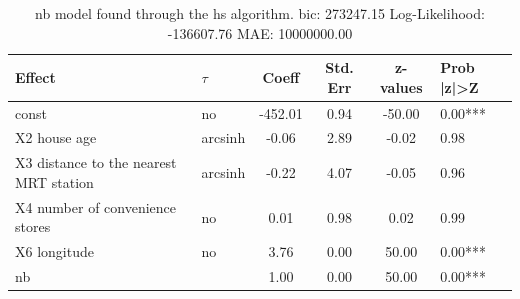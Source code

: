 \begin{table}
	\caption{nb model found through the hs algorithm. bic: 273247.15 Log-Likelihood: -136607.76 MAE: 10000000.00}
	\begin{center}
		\begin{tabular}{|l|l|c|c|c|l|}
			\hline
			Effect & $\tau$ & Coeff & Std. Err & z-values & Prob |z|>Z \\
			\hline
			const & no & -452.01 & 0.94 & -50.00 & 0.00*** \\
			\hline
			X2 house age & arcsinh & -0.06 & 2.89 & -0.02 & 0.98 \\
			\hline
			X3 distance to the nearest MRT station & arcsinh & -0.22 & 4.07 & -0.05 & 0.96 \\
			\hline
			X4 number of convenience stores & no & 0.01 & 0.98 & 0.02 & 0.99 \\
			\hline
			X6 longitude & no & 3.76 & 0.00 & 50.00 & 0.00*** \\
			\hline
			nb &  & 1.00 & 0.00 & 50.00 & 0.00*** \\
			\hline
		\end{tabular}
	\end{center}
\end{table}